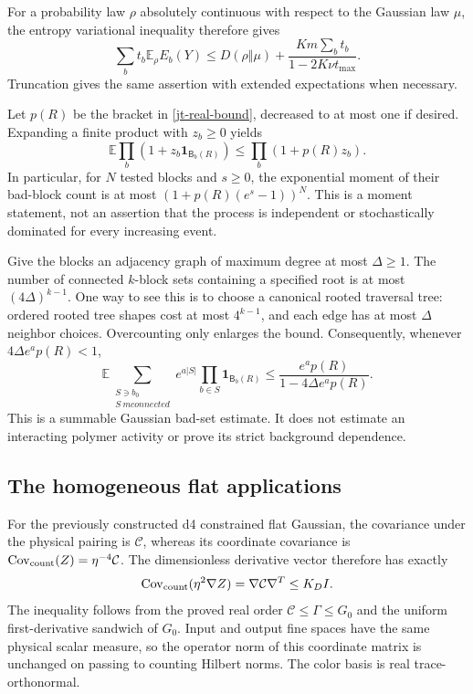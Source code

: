 \documentclass[11pt]{article}
\theoremstyle{remark}\newtheorem{remark}[theorem]{Remark}
\begin{document}
For a probability law $\rho$ absolutely continuous with respect
to the Gaussian law $\mu$, the entropy variational inequality
therefore gives
\begin{equation}\label{jt-relative-entropy}
 \sum_b t_b\mathbb E_\rho E_b(Y)
 \le D(\rho\Vert\mu)
       +\frac{Km\sum_b t_b}{1-2K\nu t_{\max}}.
\end{equation}
Truncation gives the same assertion with extended expectations
when necessary.

Let $p(R)$ be the bracket in \eqref{jt-real-bound}, decreased
to at most one if desired. Expanding a finite product with
$z_b\ge0$ yields
\begin{equation}\label{jt-bad-count-product}
 \mathbb E\prod_b(1+z_b\mathbf1_{\mathsf B_b(R)})
 \le\prod_b(1+p(R)z_b).
\end{equation}
In particular, for $N$ tested blocks and $s\ge0$, the
exponential moment of their bad-block count is at most
$(1+p(R)(e^s-1))^N$. This is a moment statement, not an
assertion that the process is independent or stochastically
dominated for every increasing event.

Give the blocks an adjacency graph of maximum degree at most
$\Delta\ge1$. The number of connected $k$-block sets containing
a specified root is at most $(4\Delta)^{k-1}$. One way to see
this is to choose a canonical rooted traversal tree: ordered
rooted tree shapes cost at most $4^{k-1}$, and each edge has
at most $\Delta$ neighbor choices. Overcounting only enlarges
the bound. Consequently, whenever $4\Delta e^a p(R)<1$,
\begin{equation}\label{jt-connected-sum}
 \boxed{\quad
 \mathbb E\sum_{\substack{S\ni b_0\\S\ {
m connected}}}
 e^{a|S|}\prod_{b\in S}\mathbf1_{\mathsf B_b(R)}
 \le\frac{e^a p(R)}{1-4\Delta e^a p(R)}.
 \quad}
\end{equation}
This is a summable Gaussian bad-set estimate. It does not
estimate an interacting polymer activity or prove its strict
background dependence.

\subsection{The homogeneous flat applications}
\label{jt-flat-applications}

For the previously constructed d4 constrained flat Gaussian,
the covariance under the physical pairing is $\mathcal C$,
whereas its coordinate covariance is
$\operatorname{Cov}_{\rm count}(Z)=\eta^{-4}\mathcal C$.
The dimensionless derivative vector therefore has exactly
\begin{equation}\label{jt-derivative-covariance}
 \operatorname{Cov}_{\rm count}(\eta^2\nabla Z)
 =\nabla\mathcal C\nabla^T\le K_D I.
\end{equation}
The inequality follows from the proved real order
$\mathcal C\le\Gamma\le G_0$ and the uniform first-derivative
sandwich of $G_0$. Input and output fine spaces have the same
physical scalar measure, so the operator norm of this coordinate
matrix is unchanged on passing to counting Hilbert norms.
The color basis is real trace-orthonormal.
\end{document}
